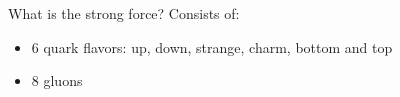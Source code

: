 \documentclass[10pt,show notes on second screen]{beamer}
\begin{document}
\begin{frame}{What is the strong force?}
Consists of:
\begin{itemize}
    \item <1->{6 quark flavors: up, down, strange, charm, bottom and top}
    \item <2->{8 gluons}
\end{itemize}
\begin{columns}
    \begin{minipage}[b][0.45\textheight][b]{\linewidth}
    \end{minipage}
    \begin{minipage}[b][0.45\textheight][b]{\linewidth}
    \end{minipage}
\end{columns}
\end{frame}
\end{document}
